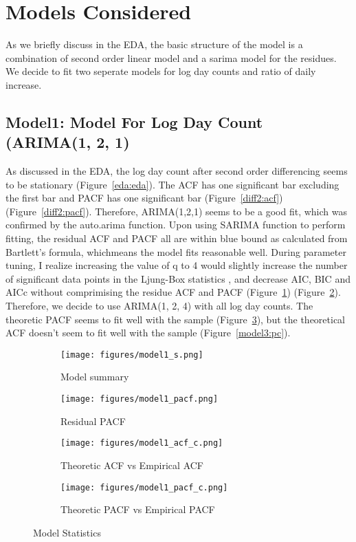 \documentclass[a4paper]{article}
\begin{document}
\section{Models Considered}

As we briefly discuss in the EDA, the basic structure  of the model is a
combination of second order linear model and a sarima model for the residues.
We decide to fit two seperate models for log day counts and ratio of daily increase.

\subsection{Model1: Model For Log Day Count (ARIMA(1, 2, 1)}
As discussed in the EDA, the log day count after second order differencing seems
to be stationary (Figure~\ref{eda:eda}). The ACF has one significant bar excluding
the first bar and PACF has one significant
bar (Figure~\ref{diff2:acf})(Figure~\ref{diff2:pacf}). Therefore, ARIMA(1,2,1)
seems to be a good fit, which was confirmed by the auto.arima function. Upon using
SARIMA function to perform fitting, the residual ACF and PACF all are within blue
bound as calculated from Bartlett's formula, whichmeans the model fits reasonable
well. During parameter tuning, I realize increasing the value of q to 4 would
slightly increase the number of significant data points in the Ljung-Box
statistics , and decrease AIC, BIC and AICc without comprimising the residue ACF
and PACF (Figure~\ref{model1:s}) (Figure~\ref{model1:p}). Therefore, we decide to
use ARIMA(1, 2, 4) with all log day counts. The theoretic PACF seems to fit well
with the sample (Figure~\ref{model1:ac}), but the theoretical ACF doesn't seem to
fit well with the sample (Figure~\ref{model3:pc}).


\begin{figure}[htpb]
\centering
\begin{subfigure}{.5\textwidth}
  \centering
  \texttt{[image: figures/model1\_s.png]}
  \caption{Model summary}
  \label{model1:s}
\end{subfigure}%
\begin{subfigure}{.5\textwidth}
  \centering
  \texttt{[image: figures/model1\_pacf.png]}
  \caption{Residual PACF}
  \label{model1:p}
\end{subfigure}

\begin{subfigure}{.5\textwidth}
	\centering
	\texttt{[image: figures/model1\_acf\_c.png]}
	\caption{Theoretic ACF vs Empirical ACF}
	\label{model1:ac}
\end{subfigure}%
\begin{subfigure}{.5\textwidth}
	\centering
	\texttt{[image: figures/model1\_pacf\_c.png]}
	\caption{Theoretic PACF vs Empirical PACF}
	\label{model1:pc}
\end{subfigure}

\caption{Model Statistics}
\label{model1}
\end{figure}
\end{document}
